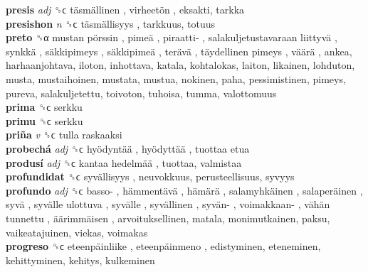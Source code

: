 \textbf{presis} \emph{adj}  ␝ϲ   täsmällinen ,  virheetön , eksakti, tarkka  \\
\textbf{presishon} \emph{n}  ␝ϲ   täsmällisyys , tarkkuus, totuus  \\
\textbf{preto} ␝α   mustan pörssin ,  pimeä ,  piraatti- ,  salakuljetustavaraan liittyvä ,  synkkä ,  säkkipimeys ,  säkkipimeä ,  terävä ,  täydellinen pimeys ,  väärä , ankea, harhaanjohtava, iloton, inhottava, katala, kohtalokas, laiton, likainen, lohduton, musta, mustaihoinen, mustata, mustua, nokinen, paha, pessimistinen, pimeys, pureva, salakuljetettu, toivoton, tuhoisa, tumma, valottomuus  \\
\textbf{prima} ␝ϲ  serkku  \\
\textbf{primu} ␝ϲ  serkku  \\
\textbf{priña} \emph{v}  ␝ϲ   tulla raskaaksi   \\
\textbf{probechá} \emph{adj}  ␝ϲ   hyödyntää ,  hyödyttää ,  tuottaa etua   \\
\textbf{produsí} \emph{adj}  ␝ϲ   kantaa hedelmää , tuottaa, valmistaa  \\
\textbf{profundidat} ␝ϲ   syvällisyys , neuvokkuus, perusteellisuus, syvyys  \\
\textbf{profundo} \emph{adj}  ␝ϲ   basso- ,  hämmentävä ,  hämärä ,  salamyhkäinen ,  salaperäinen ,  syvä ,  syvälle ulottuva ,  syvälle ,  syvällinen ,  syvän- ,  voimakkaan- ,  vähän tunnettu ,  äärimmäisen , arvoituksellinen, matala, monimutkainen, paksu, vaikeatajuinen, viekas, voimakas  \\
\textbf{progreso} ␝ϲ   eteenpäinliike ,  eteenpäinmeno , edistyminen, eteneminen, kehittyminen, kehitys, kulkeminen  \\
